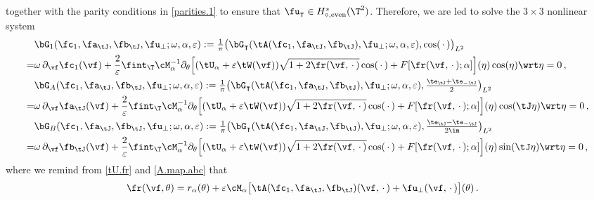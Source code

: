 \documentclass[a4paper,reqno,10pt]{article}
\newcommand{\pa}{\partial}
\begin{document}
 together with the parity conditions in \eqref{parities.1} to ensure that $\fu_{\intercal}\in H_{\circ,{\rm even}}^s(\T^2)$. Therefore, we are led to solve the $3\times 3$ nonlinear system 
				\begin{align}
			&\bG_{1}(\fc_{1},\fa_{\tJ},\fb_{\tJ},\fu_{\perp};\omega,\alpha,\varepsilon):= \tfrac{1}{\pi}\big( \bG_{\intercal}(\tA(\fc_{1},\fa_{\tJ},\fb_{\tJ}),\fu_{\perp};\omega,\alpha,\varepsilon),\cos(\,\cdot\,)\big)_{L^2} \label{bG1} \\
			=&  \omega\,\pa_{\vf}\fc_{1}(\vf)+ \frac{2}{\varepsilon} \fint_{\T} \cM_{\alpha}^{-1} \pa_{\theta}\Big[ (\tU_{\alpha}+ \varepsilon \tW(\vf))  \sqrt{1+2 \fr(\vf,\,\cdot\,)} \cos(\,\cdot\,) + F[\fr(\vf,\,\cdot\,);\alpha]  \Big](\eta) \cos(\eta) \wrt\eta = 0  \,, \\
			&\bG_{A}(\fc_{1},\fa_{\tJ},\fb_{\tJ},\fu_{\perp};\omega,\alpha,\varepsilon):= \tfrac{1}{\pi}\big( \bG_{\intercal}(\tA(\fc_{1},\fa_{\tJ},\fb_{\tJ}),\fu_{\perp};\omega,\alpha,\varepsilon),\tfrac{\te_{\tJ}+\te_{-\tJ}}{2}\big)_{L^2} \label{bGA} \\
			=& \omega\,\pa_{\vf}\fa_{\tJ}(\vf) + \frac{2}{\varepsilon} \fint_{\T} \cM_{\alpha}^{-1} \pa_{\theta}\Big[ (\tU_{\alpha}+ \varepsilon \tW(\vf))  \sqrt{1+2 \fr(\vf,\,\cdot\,)} \cos(\,\cdot\,) + F[\fr(\vf,\,\cdot\,);\alpha]  \Big](\eta) \cos(\tJ\eta) \wrt\eta = 0  \,,  \\ &\bG_{B}(\fc_{1},\fa_{\tJ},\fb_{\tJ},\fu_{\perp};\omega,\alpha,\varepsilon):= \tfrac{1}{\pi}\big( \bG_{\intercal}(\tA(\fc_{1},\fa_{\tJ},\fb_{\tJ}),\fu_{\perp};\omega,\alpha,\varepsilon),\tfrac{\te_{\tJ}-\te_{-\tJ}}{2\im}\big)_{L^2} \label{bGB} \\
			=& \omega\,\pa_{\vf}\fb_{\tJ}(\vf) + \frac{2}{\varepsilon} \fint_{\T} \cM_{\alpha}^{-1} \pa_{\theta}\Big[ (\tU_{\alpha}+ \varepsilon \tW(\vf))  \sqrt{1+2 \fr(\vf,\,\cdot\,)} \cos(\,\cdot\,) + F[\fr(\vf,\,\cdot\,);\alpha]  \Big](\eta) \sin(\tJ\eta) \wrt\eta = 0  \,, 
		\end{align}
where we remind from  \eqref{tU.fr} and \eqref{A.map.abc} that
\begin{equation}
\begin{aligned}
	\fr(\vf,\theta) & = r_\alpha(\theta) + \varepsilon \cM_{\alpha}\big[ \tA(\fc_{1},\fa_{\tJ},\fb_{\tJ})(\vf,\,\cdot\,) + \fu_{\perp}(\vf,\,\cdot\,)  \big](\theta)\,. 
\end{aligned}
\end{equation}
\end{document}

